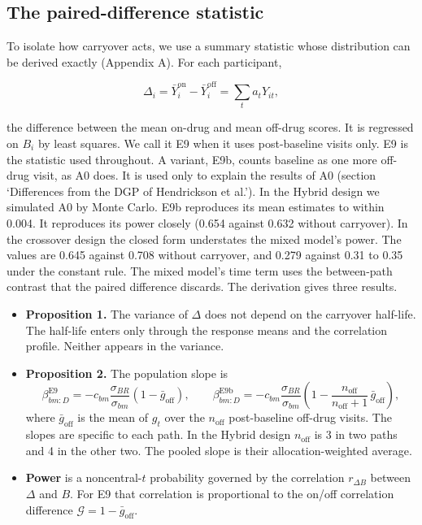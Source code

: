 \documentclass[
  11pt,
]{article}
\providecommand{\tightlist}{%
  \setlength{\itemsep}{0pt}\setlength{\parskip}{0pt}}
\begin{document}
\subsection{The paired-difference statistic}\label{the-paired-difference-statistic}

To isolate how carryover acts, we use a summary statistic whose
distribution can be derived exactly (Appendix A). For each participant,

\[\Delta_i = \bar Y_i^{\text{on}} - \bar Y_i^{\text{off}}
  = \sum_t a_t Y_{it},\]

the difference between the mean on-drug and mean off-drug scores. It
is regressed on \(B_i\) by least squares. We call it E9 when it uses
post-baseline visits only. E9 is the statistic used throughout. A
variant, E9b, counts baseline as one more off-drug visit, as A0 does.
It is used only to explain the results of A0 (section `Differences
from the DGP of Hendrickson et al.'). In the Hybrid design we
simulated A0 by Monte Carlo. E9b reproduces its mean
estimates to within 0.004. It reproduces its power closely (0.654
against 0.632 without carryover). In the crossover design the closed
form understates the mixed model's power. The values are 0.645
against 0.708 without carryover, and 0.279 against 0.31 to 0.35 under
the constant rule. The mixed model's time term uses the
between-path contrast that the paired difference discards. The
derivation gives three results.

\begin{itemize}
\tightlist
\item
  \textbf{Proposition 1.} The variance of \(\Delta\) does not depend on the
  carryover half-life. The half-life enters only through the response
  means and the correlation profile. Neither appears in the variance.
\item
  \textbf{Proposition 2.} The population slope is
  \[\beta_{bm:D}^{\text{E9}}
    = -c_{bm}\frac{\sigma_{BR}}{\sigma_{bm}}\left(1 - \bar g_{\text{off}}\right),
  \qquad
  \beta_{bm:D}^{\text{E9b}}
    = -c_{bm}\frac{\sigma_{BR}}{\sigma_{bm}}
      \left(1 - \frac{n_{\text{off}}}{n_{\text{off}} + 1}\,
      \bar g_{\text{off}}\right),\]
  where \(\bar g_{\text{off}}\) is the mean of \(g_t\) over the
  \(n_{\text{off}}\) post-baseline off-drug visits. The slopes are
  specific to each path. In the Hybrid design \(n_{\text{off}}\) is 3 in
  two paths and 4 in the other two. The pooled slope is their
  allocation-weighted average.
\item
  \textbf{Power} is a noncentral-\(t\) probability governed by the correlation
  \(r_{\Delta B}\) between \(\Delta\) and \(B\). For E9 that correlation is
  proportional to the on/off correlation difference
  \(\mathcal G = 1 - \bar g_{\text{off}}\).
\end{itemize}
\end{document}
